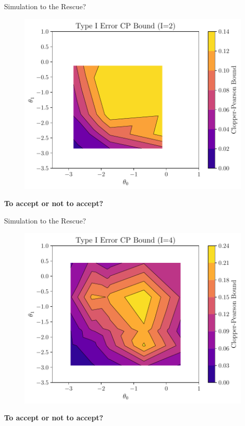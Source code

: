 \begin{frame}{Simulation to the Rescue?}
\begin{figure}
    \centering
    \includegraphics[width=0.9\linewidth]{figs/introduction_rescue_0.pdf}
\end{figure}
\begin{center}
    \textbf{To accept or not to accept?}
\end{center}
\end{frame}

\begin{frame}{Simulation to the Rescue?}
\begin{figure}
    \centering
    \includegraphics[width=0.9\linewidth]{figs/introduction_rescue_1.pdf}
\end{figure}
\begin{center}
    \textbf{To accept or not to accept?}
\end{center}
\end{frame}

